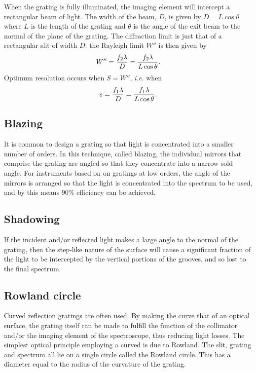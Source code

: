 When the grating is fully illuminated, the imaging element will intercept a rectangular 
beam of light. The width of the beam, $D$, is given by $D=L\cos\theta$ where $L$ is 
the length of the grating and $\theta$ is the angle of the exit beam to the normal of the
plane of the grating. The diffraction limit is just that of a rectangular slit of width $D$:
the Rayleigh limit $W''$ is then given by 
\[
W''={f_2\lambda\over D}={f_2\lambda\over L\cos\theta}.
\]
Optimum resolution occurs when $S=W''$, {\it i.e.} when
\[ 
s={f_1\lambda\over D}={f_1\lambda\over L\cos\theta}.
\]

\subsection{Blazing}
It is common to design a grating so that light is concentrated into a smaller
number of orders. In this technique, called blazing, the individual mirrors that comprise
the grating are angled so that they concentrate into a narrow sold angle. For instruments
based on on gratings at low orders, the angle of the mirrors is arranged so that the light
is concentrated into the spectrum to be used, and by this means 90\% efficiency can be
achieved. 

\subsection{Shadowing}
If the incident and/or reflected light makes a large angle to the normal of
the grating, then the step-like nature of the surface will cause a significant fraction 
of the light to be intercepted by the vertical portions of the grooves, and so lost to the final spectrum. 

\subsection{Rowland circle}
Curved reflection gratings are often used. By making the curve that of
an optical surface, the grating itself can be made to fulfill the function of the collimator
and/or the imaging element of the spectroscope, thus reducing light losses. The simplest optical principle employing a curved is due to Rowland. The slit, grating and 
spectrum all lie on a single circle called the Rowland circle. This has a diameter equal
to the radius of the curvature of the grating. 


